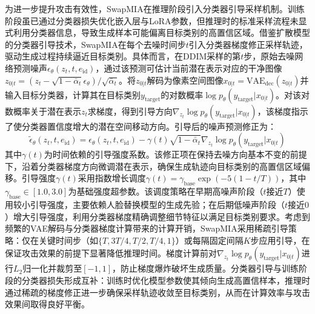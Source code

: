 为进一步提升攻击有效性，SwapMIA在推理阶段引入分类器引导采样机制。训练阶段虽已通过分类器损失优化嵌入层与LoRA参数，但推理时的标准采样流程未显式利用分类器信息，导致生成样本可能偏离目标类别的高置信区域。借鉴扩散模型的分类器引导技术\cite{rombach2022high}，SwapMIA在每个去噪时间步$t$引入分类器梯度修正采样轨迹，驱动生成过程持续逼近目标类别。具体而言，在DDIM采样的第$t$步，原始去噪网络预测噪声$\epsilon_\theta(z_t, t, e_{\text{id}})$，通过该预测可估计当前潜在表示对应的干净图像$z_{0|t} = (z_t - \sqrt{1-\bar{\alpha}_t}\epsilon_\theta) / \sqrt{\bar{\alpha}_t}$。将$z_{0|t}$解码为像素空间图像$x_{0|t} = \text{VAE}_{\text{dec}}(z_{0|t})$并输入目标分类器，计算其在目标类别$y_{\text{target}}$的对数概率$\log p_\theta(y_{\text{target}}|x_{0|t})$。对该对数概率关于潜在表示$z_t$求梯度，得到引导方向$\nabla_{z_t} \log p_\theta(y_{\text{target}}|x_{0|t})$，该梯度指示了使分类器置信度增大的潜在空间移动方向。引导后的噪声预测修正为：
\begin{equation}\label{eq:mia_classifier_guidance}
    \tilde{\epsilon}_\theta(z_t, t, e_{\text{id}}) = \epsilon_\theta(z_t, t, e_{\text{id}}) - \gamma(t) \sqrt{1-\bar{\alpha}_t} \nabla_{z_t} \log p_\theta(y_{\text{target}}|x_{0|t})
\end{equation}
其中$\gamma(t)$为时间依赖的引导强度系数。该修正项在保持去噪方向基本不变的前提下，沿着分类器梯度方向微调潜在表示，确保生成轨迹向目标类别的高置信区域偏移。引导强度$\gamma(t)$采用指数增长调度$\gamma(t) = \gamma_{\text{base}} \exp(-5(1-t/T))$，其中$\gamma_{\text{base}}\in[1.0, 3.0]$为基础强度超参数。该调度策略在早期高噪声阶段（$t$接近$T$）使用较小引导强度，主要依赖人脸替换模型的生成先验；在后期低噪声阶段（$t$接近$0$）增大引导强度，利用分类器梯度精确调整细节特征以满足目标类别要求。考虑到频繁的VAE解码与分类器梯度计算带来的计算开销，SwapMIA采用稀疏引导策略：仅在关键时间步（如$\{T, 3T/4, T/2, T/4, 1\}$）或每隔固定间隔$K$步应用引导，在保证攻击效果的前提下显著降低推理时间。梯度计算前对$\nabla_{z_t} \log p_\theta(y_{\text{target}}|x_{0|t})$进行$L_2$归一化并裁剪至$[-1, 1]$，防止梯度爆炸破坏生成质量。分类器引导与训练阶段的分类器损失形成互补：训练时优化模型参数使其倾向生成高置信样本，推理时通过稀疏的梯度修正进一步确保采样轨迹收敛至目标类别，从而在计算效率与攻击效果间取得良好平衡。

